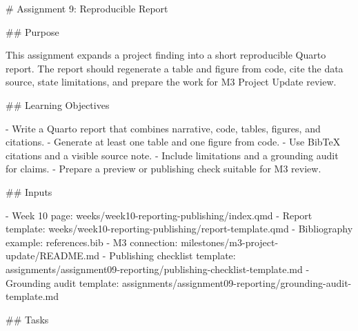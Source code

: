 \documentclass[
  letterpaper,
  DIV=11,
  numbers=noendperiod,
  oneside]{scrreprt}
\newenvironment{Shaded}{\begin{snugshade}}{\end{snugshade}}
\newcommand{\FunctionTok}[1]{\textcolor[rgb]{0.28,0.35,0.67}{#1}}
\newcommand{\InformationTok}[1]{\textcolor[rgb]{0.37,0.37,0.37}{#1}}
\newcommand{\NormalTok}[1]{\textcolor[rgb]{0.00,0.23,0.31}{#1}}
\newcommand{\SpecialStringTok}[1]{\textcolor[rgb]{0.13,0.47,0.30}{#1}}
\begin{document}
\begin{Shaded}
\begin{Highlighting}[numbers=left,,]
\FunctionTok{\# Assignment 9: Reproducible Report }


\FunctionTok{\#\# Purpose}

\NormalTok{This assignment expands a project finding into a short reproducible Quarto report. The report should regenerate a table and figure from code, cite the data source, state limitations, and prepare the work for M3 Project Update review.}

\FunctionTok{\#\# Learning Objectives}

\SpecialStringTok{{-} }\NormalTok{Write a Quarto report that combines narrative, code, tables, figures, and citations.}
\SpecialStringTok{{-} }\NormalTok{Generate at least one table and one figure from code.}
\SpecialStringTok{{-} }\NormalTok{Use BibTeX citations and a visible source note.}
\SpecialStringTok{{-} }\NormalTok{Include limitations and a grounding audit for claims.}
\SpecialStringTok{{-} }\NormalTok{Prepare a preview or publishing check suitable for M3 review.}

\FunctionTok{\#\# Inputs}

\SpecialStringTok{{-} }\NormalTok{Week 10 page: }\InformationTok{\textasciigrave{}weeks/week10{-}reporting{-}publishing/index.qmd\textasciigrave{}}
\SpecialStringTok{{-} }\NormalTok{Report template: }\InformationTok{\textasciigrave{}weeks/week10{-}reporting{-}publishing/report{-}template.qmd\textasciigrave{}}
\SpecialStringTok{{-} }\NormalTok{Bibliography example: }\InformationTok{\textasciigrave{}references.bib\textasciigrave{}}
\SpecialStringTok{{-} }\NormalTok{M3 connection: }\InformationTok{\textasciigrave{}milestones/m3{-}project{-}update/README.md\textasciigrave{}}
\SpecialStringTok{{-} }\NormalTok{Publishing checklist template: }\InformationTok{\textasciigrave{}assignments/assignment09{-}reporting/publishing{-}checklist{-}template.md\textasciigrave{}}
\SpecialStringTok{{-} }\NormalTok{Grounding audit template: }\InformationTok{\textasciigrave{}assignments/assignment09{-}reporting/grounding{-}audit{-}template.md\textasciigrave{}}

\FunctionTok{\#\# Tasks}


\end{Highlighting}
\end{Shaded}
\end{document}

